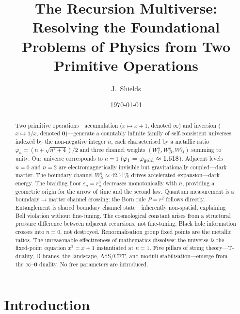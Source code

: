 \documentclass[prd,twocolumn,preprintnumbers,amsmath,amssymb]{revtex4-2}
\newcommand{\acc}{\mathbf{\infty}}
\newcommand{\inv}{\mathbf{0}}
\begin{document}
\title{The Recursion Multiverse: Resolving the Foundational\\
       Problems of Physics from Two Primitive Operations}

\author{J.~Shields}
\date{\today}

\begin{abstract}
Two primitive operations---accumulation ($x \mapsto x+1$, denoted
$\acc$) and inversion ($x \mapsto 1/x$, denoted $\inv$)---generate
a countably infinite family of self-consistent universes indexed by
the non-negative integer $n$, each characterised by a metallic ratio
$\varphi_n = (n+\sqrt{n^2+4})/2$ and three channel weights
$(W_L^n, W_B^n, W_M^n)$ summing to unity.  Our universe corresponds
to $n=1$ ($\varphi_1 = \varphi_{\rm gold} \approx 1.618$).  Adjacent
levels $n=0$ and $n=2$ are electromagnetically invisible but
gravitationally coupled---dark matter.  The boundary channel
$W_B^1 \approx 42.71\%$ drives accelerated expansion---dark energy.
The braiding floor $\varepsilon_n = r_n^3$ decreases monotonically
with $n$, providing a geometric origin for the arrow of time and the
second law.  Quantum measurement is a boundary$\to$matter channel
crossing; the Born rule $P = r^2$ follows directly.  Entanglement is
shared boundary channel state---inherently non-spatial, explaining
Bell violation without fine-tuning.  The cosmological constant arises
from a structural pressure difference between adjacent recursions, not
fine-tuning.  Black hole information crosses into $n=0$, not destroyed.
Renormalisation group fixed points are the metallic ratios.  The
unreasonable effectiveness of mathematics dissolves: the universe
\emph{is} the fixed-point equation $x^2 = x+1$ instantiated at $n=1$.
Five pillars of string theory---T-duality, D-branes, the landscape,
AdS/CFT, and moduli stabilisation---emerge from the $\acc$--$\inv$
duality.  No free parameters are introduced.
\end{abstract}

\maketitle

\section{Introduction}
\label{sec:intro}
\end{document}
